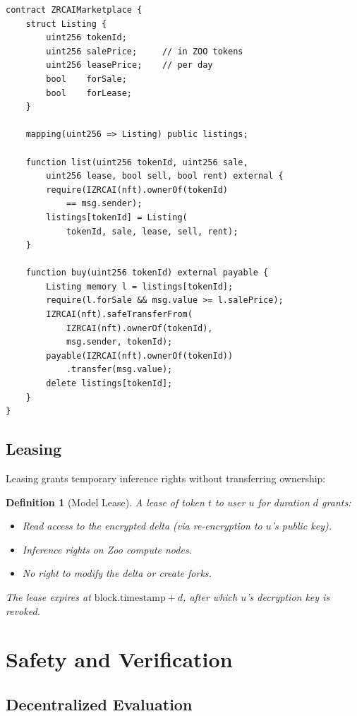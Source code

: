 \documentclass[11pt,letterpaper]{article}
\newtheorem{definition}{Definition}[section]
\begin{document}
\begin{lstlisting}[language=Solidity,caption=Model marketplace contract]
contract ZRCAIMarketplace {
    struct Listing {
        uint256 tokenId;
        uint256 salePrice;     // in ZOO tokens
        uint256 leasePrice;    // per day
        bool    forSale;
        bool    forLease;
    }

    mapping(uint256 => Listing) public listings;

    function list(uint256 tokenId, uint256 sale,
        uint256 lease, bool sell, bool rent) external {
        require(IZRCAI(nft).ownerOf(tokenId)
            == msg.sender);
        listings[tokenId] = Listing(
            tokenId, sale, lease, sell, rent);
    }

    function buy(uint256 tokenId) external payable {
        Listing memory l = listings[tokenId];
        require(l.forSale && msg.value >= l.salePrice);
        IZRCAI(nft).safeTransferFrom(
            IZRCAI(nft).ownerOf(tokenId),
            msg.sender, tokenId);
        payable(IZRCAI(nft).ownerOf(tokenId))
            .transfer(msg.value);
        delete listings[tokenId];
    }
}
\end{lstlisting}

\subsection{Leasing}

Leasing grants temporary inference rights without transferring ownership:

\begin{definition}[Model Lease]
A lease of token $t$ to user $u$ for duration $d$ grants:
\begin{itemize}
    \item Read access to the encrypted delta (via re-encryption to $u$'s public key).
    \item Inference rights on Zoo compute nodes.
    \item No right to modify the delta or create forks.
\end{itemize}
The lease expires at $\text{block.timestamp} + d$, after which $u$'s decryption key is revoked.
\end{definition}

\section{Safety and Verification}
\label{sec:safety}

\subsection{Decentralized Evaluation}
\end{document}
